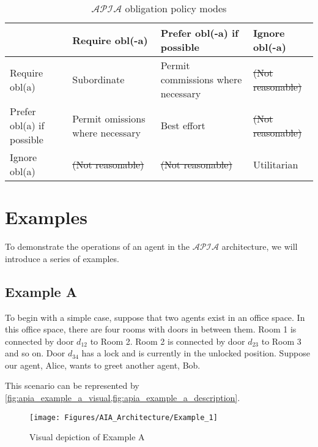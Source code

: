 \begin{table}[h]
    \centering
    \begin{tabularx}{\textwidth}{ | X | X | X | X | }
        \hline
        & Require obl(-a) & Prefer obl(-a) if possible & Ignore obl(-a) \\
        \hline
        Require obl(a) & Subordinate & Permit commissions where necessary & \sout{(Not reasonable)} \\
        \hline
        Prefer obl(a) if possible & Permit omissions where necessary & Best effort & \sout{(Not reasonable)} \\
        \hline
        Ignore obl(a) & \sout{(Not reasonable)} & \sout{(Not reasonable)} & Utilitarian \\
        \hline
    \end{tabularx}
    \caption{$\mathcal{APIA}$ obligation policy modes}
    \label{table:apia_obligation_modes}
\end{table}

\section{Examples}

To demonstrate the operations of an agent in the $\mathcal{APIA}$ architecture, we will introduce a series of examples.

\subsection{Example A}

To begin with a simple case, suppose that two agents exist in an office space.
In this office space, there are four rooms with doors in between them.
Room 1 is connected by door $d_{12}$ to Room 2.
Room 2 is connected by door $d_{23}$ to Room 3 and so on.
Door $d_{34}$ has a lock and is currently in the unlocked position.
Suppose our agent, Alice, wants to greet another agent, Bob.

This scenario can be represented by \cref{fig:apia_example_a_visual,fig:apia_example_a_description}.

\begin{figure}[h]
    \centering
    \texttt{[image: Figures/AIA\_Architecture/Example\_1]}
    \caption{Visual depiction of Example A}
    \label{fig:apia_example_a_visual}
\end{figure}

